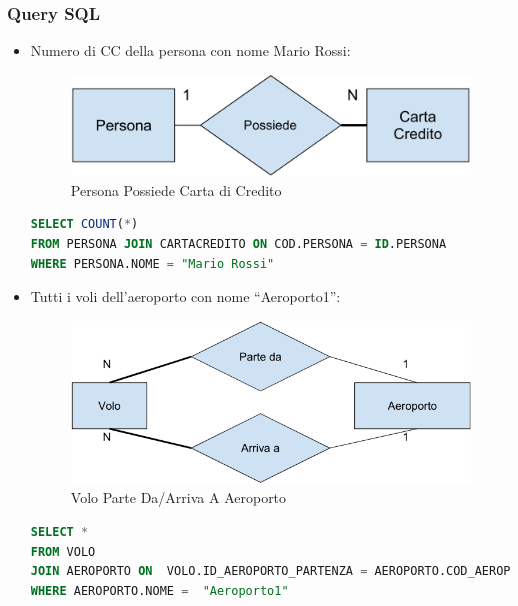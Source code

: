 \subsubsection{Query SQL}

\begin{itemize}

\item Numero di CC della persona con nome Mario Rossi:

\begin{center}
\begin{figure}[H]
\centering
\includegraphics[scale=1]{figures/persona_possiede_cc.png}
\caption{Persona Possiede Carta di Credito}
\end{figure}
\end{center}

\begin{lstlisting}[language=SQL]
SELECT COUNT(*)
FROM PERSONA JOIN CARTACREDITO ON COD.PERSONA = ID.PERSONA
WHERE PERSONA.NOME = "Mario Rossi"   
\end{lstlisting}

\item Tutti i voli dell’aeroporto con nome “Aeroporto1”:

\begin{center}
\begin{figure}[H]
\centering
\includegraphics[scale=0.8]{figures/aereoporto_volo.png}
\caption{Volo Parte Da/Arriva A Aeroporto}
\end{figure}
\end{center}

\begin{lstlisting}[language=SQL]
SELECT *
FROM VOLO
JOIN AEROPORTO ON  VOLO.ID_AEROPORTO_PARTENZA = AEROPORTO.COD_AEROPORTO
WHERE AEROPORTO.NOME =  "Aeroporto1"
\end{lstlisting}


\end{itemize}
